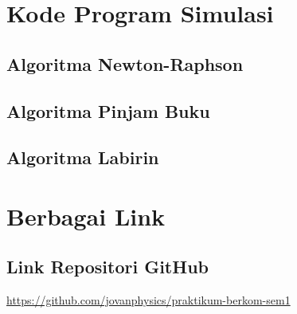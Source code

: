 \documentclass[a4paper, 12pt]{article}
\begin{document}
\section{Kode Program Simulasi}
\subsection{Algoritma Newton-Raphson}

\subsection{Algoritma Pinjam Buku}

\subsection{Algoritma Labirin}

\section{Berbagai Link}
\subsection{Link Repositori GitHub}
\url{https://github.com/jovanphysics/praktikum-berkom-sem1}
\end{document}
